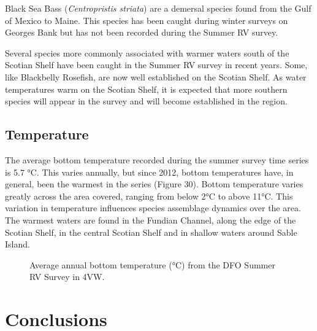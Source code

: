 \documentclass[11pt]{book}
\begin{document}
Black Sea Bass (\emph{Centropristis striata}) are a demersal species found from the Gulf of Mexico to Maine. This species has been caught during winter surveys on Georges Bank but has not been recorded during the Summer RV survey.

Several species more commonly associated with warmer waters south of the Scotian Shelf have been caught in the Summer RV survey in recent years. Some, like Blackbelly Rosefish, are now well established on the Scotian Shelf. As water temperatures warm on the Scotian Shelf, it is expected that more southern species will appear in the survey and will become established in the region.

\clearpage

\hypertarget{temperature}{%
\subsection{Temperature}\label{temperature}}

The average bottom temperature recorded during the summer survey time series is 5.7 °C. This varies annually, but since 2012, bottom temperatures have, in general, been the warmest in the series (Figure 30). Bottom temperature varies greatly across the area covered, ranging from below 2°C to above 11°C. This variation in temperature influences species assemblage dynamics over the area. The warmest waters are found in the Fundian Channel, along the edge of the Scotian Shelf, in the central Scotian Shelf and in shallow waters around Sable Island.


\begin{figure}[htb]

{\centering {} 

}

\caption{Average annual bottom temperature (°C) from the DFO Summer RV Survey in 4VW.}\label{fig:130-bottomT}
\end{figure}
\hypertarget{conclusions}{%
\section{Conclusions}\label{conclusions}}
\end{document}
